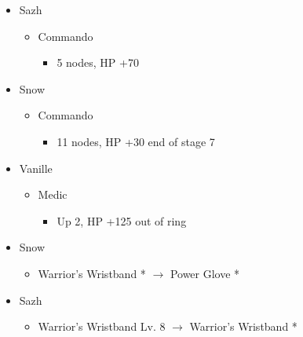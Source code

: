 \begin{paracol}{2}
\begin{menu}
\begin{itemize}
\begin{itemize}
{\paradigmline{(\rav)}{\sen}{(\rav)}}%
{\paradigmline{(\com)}{(\sen)}{\med}}%
{\paradigmline{\rav}{(\com)}{(\rav)}}%
{\paradigmline{\rav}{\rav}{\rav}}
    \end{itemize}
    \crystarium
    \begin{itemize}
        \item Sazh
        \begin{itemize}
            \item Commando
            \begin{itemize}
                \item 5 nodes, HP +70
            \end{itemize}
        \end{itemize}
        \item Snow
        \begin{itemize}
            \item Commando
            \begin{itemize}
                \item 11 nodes, HP +30 end of stage 7
            \end{itemize}
        \end{itemize}
        \item Vanille
        \begin{itemize}
            \item Medic
            \begin{itemize}
                \item Up 2, HP +125 out of ring
            \end{itemize}
        \end{itemize}
    \end{itemize}
    \equip
    \begin{itemize}
        \item Snow
        \begin{itemize}
            \item Warrior's Wristband * $\rightarrow$ Power Glove *
        \end{itemize}
        \item Sazh
        \begin{itemize}
            \item Warrior's Wristband Lv. 8 $\rightarrow$ Warrior's Wristband *
        \end{itemize}
    \end{itemize}
\end{itemize}
\end{menu}


\end{paracol}
